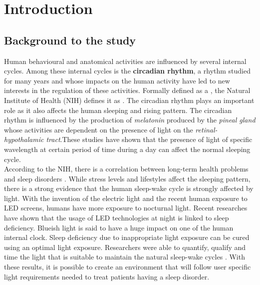 \chapter{Introduction}

\section{Background to the study}

Human behavioural and anatomical activities are influenced by several internal cycles. Among these internal cycles is the \textbf{circadian rhythm}, a rhythm studied for many years and whose impacts on the human activity have led to new interests in the regulation of these activities. Formally defined as a  \cite{ge2014}, the Natural Institute of Health (NIH) defines it as \cite{ge2014}. The circadian rhythm plays an important role as it also affects the human sleeping and rising pattern. The circadian rhythm is influenced by the production of \textit{melatonin} produced by the \textit{pineal gland} whose activities are dependent on the presence of light on the \textit{retinal-hypothalamic tract}\cite{lig1994}.These studies have shown that the presence of light of specific wavelength at certain period of time during a day can affect the normal sleeping cycle.\\   
According to the NIH, there is a correlation between long-term health problems and sleep disorders \cite{ph2002}. While stress levels and lifestyles affect the sleeping pattern, there is a strong evidence that the human sleep-wake cycle is strongly affected by light. With the invention of the electric light and the recent human exposure to LED screens, humans have more exposure to nocturnal light. Recent researches have shown that the usage of LED technologies at night is linked to sleep deficiency. Blueish light is said to have a huge impact on one of the human internal clock\cite{bl2010}. Sleep deficiency due to inappropriate light exposure can be cured using an optimal light exposure\cite{bl2010}. Researchers were able to quantify, qualify and time the light that is suitable to maintain the natural sleep-wake cycles \cite{cir2014}. With these results, it is possible to create an environment that will follow user specific light requirements needed to treat patients having a sleep disorder.


